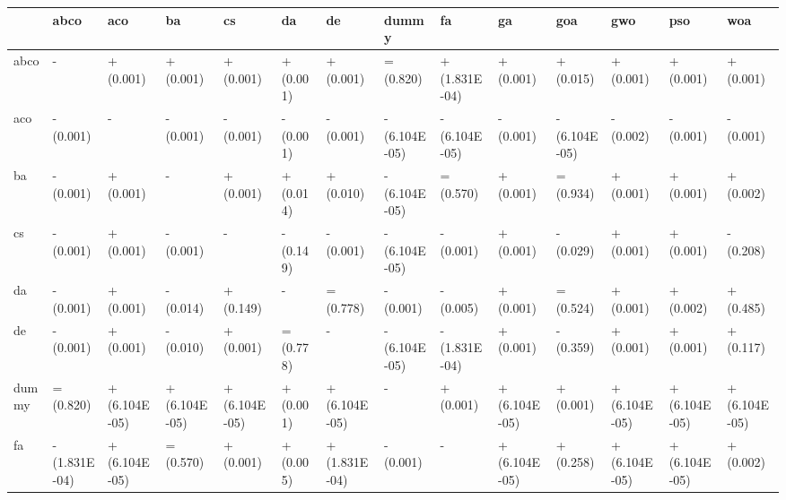 \begin{table}
    \centering
    \begin{adjustbox}{width=\linewidth}
        \begin{tabular}{llllllllllllll}
            \toprule
            {}    & abco          & aco           & ba            & cs            & da        & de            & dummy         & fa            & ga            & goa           & gwo           & pso           & woa           \\
            \midrule
            abco  & -             & + (0.001)     & + (0.001)     & + (0.001)     & + (0.001) & + (0.001)     & = (0.820)     & + (1.831E-04) & + (0.001)     & + (0.015)     & + (0.001)     & + (0.001)     & + (0.001)     \\
            aco   & - (0.001)     & -             & - (0.001)     & - (0.001)     & - (0.001) & - (0.001)     & - (6.104E-05) & - (6.104E-05) & - (0.001)     & - (6.104E-05) & - (0.002)     & - (0.001)     & - (0.001)     \\
            ba    & - (0.001)     & + (0.001)     & -             & + (0.001)     & + (0.014) & + (0.010)     & - (6.104E-05) & = (0.570)     & + (0.001)     & = (0.934)     & + (0.001)     & + (0.001)     & + (0.002)     \\
            cs    & - (0.001)     & + (0.001)     & - (0.001)     & -             & - (0.149) & - (0.001)     & - (6.104E-05) & - (0.001)     & + (0.001)     & - (0.029)     & + (0.001)     & + (0.001)     & - (0.208)     \\
            da    & - (0.001)     & + (0.001)     & - (0.014)     & + (0.149)     & -         & = (0.778)     & - (0.001)     & - (0.005)     & + (0.001)     & = (0.524)     & + (0.001)     & + (0.002)     & + (0.485)     \\
            de    & - (0.001)     & + (0.001)     & - (0.010)     & + (0.001)     & = (0.778) & -             & - (6.104E-05) & - (1.831E-04) & + (0.001)     & - (0.359)     & + (0.001)     & + (0.001)     & + (0.117)     \\
            dummy & = (0.820)     & + (6.104E-05) & + (6.104E-05) & + (6.104E-05) & + (0.001) & + (6.104E-05) & -             & + (0.001)     & + (6.104E-05) & + (0.001)     & + (6.104E-05) & + (6.104E-05) & + (6.104E-05) \\
            fa    & - (1.831E-04) & + (6.104E-05) & = (0.570)     & + (0.001)     & + (0.005) & + (1.831E-04) & - (0.001)     & -             & + (6.104E-05) & + (0.258)     & + (6.104E-05) & + (6.104E-05) & + (0.002)     \\

\end{tabular}
\end{adjustbox}
\end{table}

